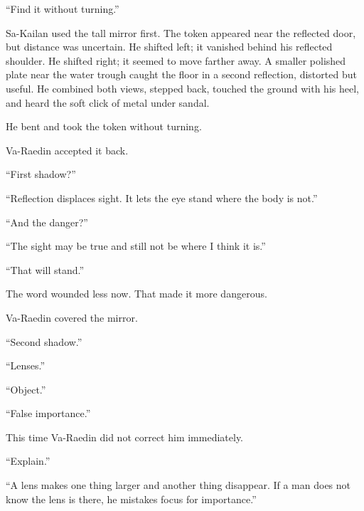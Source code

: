 “Find it without turning.”\par

Sa-Kailan used the tall mirror first.
The token appeared near the reflected door, but distance was uncertain.
He shifted left; it vanished behind his reflected shoulder.
He shifted right; it seemed to move farther away.
A smaller polished plate near the water trough caught the floor in a second reflection, distorted but useful.
He combined both views, stepped back, touched the ground with his heel, and heard the soft click of metal under sandal.\par

He bent and took the token without turning.\par

Va-Raedin accepted it back.\par

“First shadow?”\par

“Reflection displaces sight.
It lets the eye stand where the body is not.”\par

“And the danger?”\par

“The sight may be true and still not be where I think it is.”\par

“That will stand.”\par

The word wounded less now.
That made it more dangerous.\par

Va-Raedin covered the mirror.\par

“Second shadow.”\par

“Lenses.”\par

“Object.”\par

“False importance.”\par

This time Va-Raedin did not correct him immediately.\par

“Explain.”\par

“A lens makes one thing larger and another thing disappear.
If a man does not know the lens is there, he mistakes focus for importance.”\par


